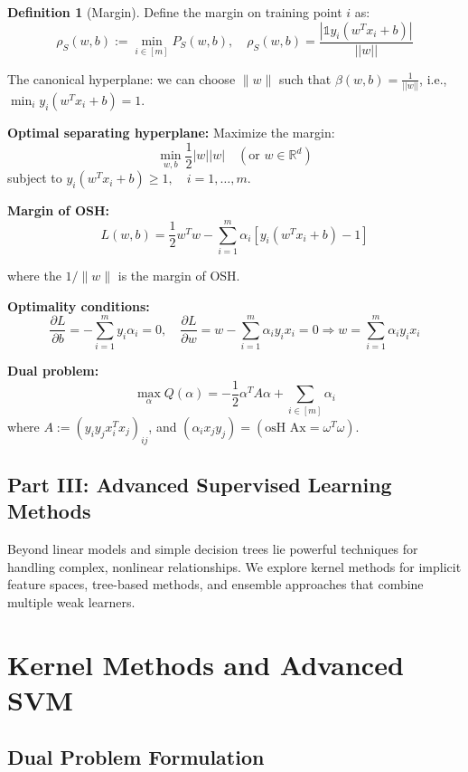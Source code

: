 \documentclass[12pt,a4paper]{article}
\theoremstyle{definition}
\newtheorem{definition}{Definition}[section]
\begin{document}
\begin{definition}[Margin]
Define the margin on training point $i$ as:
\[
\rho_S(w,b) := \min_{i \in [m]} P_S(w,b), \quad \rho_S(w,b) = \frac{|\mathbb{1} y_i(w^T x_i + b)|}{||w||}
\]

The canonical hyperplane: we can choose $\|w\|$ such that $\beta(w,b) = \frac{1}{||w||}$, i.e., $\min_i y_i(w^T x_i + b) = 1$.

\textbf{Optimal separating hyperplane:} Maximize the margin:
\[
\min_{w, b} \frac{1}{2} |w||w| \quad (\text{or } w \in \mathbb{R}^d)
\]
subject to $y_i(w^T x_i + b) \geq 1, \quad i = 1, \ldots, m$.

\textbf{Margin of OSH:}
\[
L(w, b) = \frac{1}{2} w^T w - \sum_{i=1}^m \alpha_i [y_i(w^T x_i + b) - 1]
\]

where the $1/\|w\|$ is the margin of OSH.

\textbf{Optimality conditions:}
\[
\frac{\partial L}{\partial b} = -\sum_{i=1}^m y_i \alpha_i = 0, \quad \frac{\partial L}{\partial w} = w - \sum_{i=1}^m \alpha_i y_i x_i = 0 \Rightarrow w = \sum_{i=1}^m \alpha_i y_i x_i
\]

\textbf{Dual problem:}
\[
\max_{\alpha} Q(\alpha) = -\frac{1}{2} \alpha^T A \alpha + \sum_{i \in [m]} \alpha_i
\]
where $A := (y_i y_j x_i^T x_j)_{ij}$, and $(\alpha_i x_j y_j) = (\text{osH Ax} = \omega^T \omega)$.
\end{definition}

\newpage
\newpage
\vspace*{2cm}
\begin{center}
    \section*{\Large Part III: Advanced Supervised Learning Methods}
\end{center}
\vspace*{1cm}
\nobreak

Beyond linear models and simple decision trees lie powerful techniques for handling complex, nonlinear relationships. We explore kernel methods for implicit feature spaces, tree-based methods, and ensemble approaches that combine multiple weak learners.

\newpage

\section{Kernel Methods and Advanced SVM}

\subsection{Dual Problem Formulation}
\end{document}
